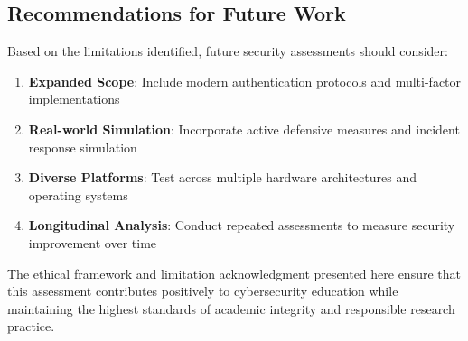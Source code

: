\subsection{Recommendations for Future Work}

Based on the limitations identified, future security assessments should consider:

\begin{enumerate}
    \item \textbf{Expanded Scope}: Include modern authentication protocols and multi-factor implementations
    \item \textbf{Real-world Simulation}: Incorporate active defensive measures and incident response simulation
    \item \textbf{Diverse Platforms}: Test across multiple hardware architectures and operating systems
    \item \textbf{Longitudinal Analysis}: Conduct repeated assessments to measure security improvement over time
\end{enumerate}

The ethical framework and limitation acknowledgment presented here ensure that this assessment contributes positively to cybersecurity education while maintaining the highest standards of academic integrity and responsible research practice.